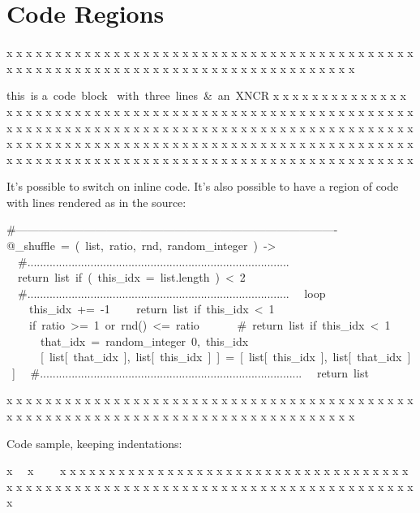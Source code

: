 \section{Code Regions
}
\begin{multicols}{2}x x x x x x x x x x x x x x x x x x x x x x x x x x
x x x x x x x x x x x x x x x x x x x x x x x x x x
x x x x x x x x x x x x x x x x x x x x x x x x x x\mktsShowpar\par
\begingroup\obeyalllines\mktsStyleCode{}this is
a code block 
with three lines \& an XNCR
\endgroup{}x x x x x x x x x x x x x x x x x x x x x x x x x x
x x x x x x x x x x x x x x x x x x x x x x x x x x
x x x x x x x x x x x x x x x x x x x x x x x x x x
x x x x x x x x x x x x x x x x x x x x x x x x x x
x x x x x x x x x x x x x x x x x x x x x x x x x x
x x x x x x x x x x x x x x x x x x x x x x x x x x
x x x x x x x x x x x x x x x x x x x x x x x x x x\mktsShowpar\par
It’s possible to switch on {\mktsStyleCode{}inline code}. It’s also possible
to have a region of code with lines rendered as in the source:
\mktsShowpar\par
\end{multicols}\begingroup\obeyalllines\mktsStyleCode{}\#-------------------------------------------------------------------------------------
@\_shuffle = ( list, ratio, rnd, random\_integer ) ->
  \#...................................................................................
  return list if ( this\_idx = list.length ) < 2
  \#...................................................................................
  loop
    this\_idx += -1
    return list if this\_idx < 1
    if ratio >= 1 or rnd() <= ratio
      \# return list if this\_idx < 1
      that\_idx = random\_integer 0, this\_idx
      [ list[ that\_idx ], list[ this\_idx ] ] = [ list[ this\_idx ], list[ that\_idx ] ]
  \#...................................................................................
  return list
\endgroup{}\begin{multicols}{2}x x x x x x x x x x x x x x x x x x x x x x x x x x
x x x x x x x x x x x x x x x x x x x x x x x x x x
x x x x x x x x x x x x x x x x x x x x x x x x x x\mktsShowpar\par
Code sample, keeping indentations:\mktsShowpar\par
\begingroup\obeyalllines\mktsStyleCode{}x
  x
    x
\endgroup{}x x x x x x x x x x x x x x x x x x x x x x x x x x
x x x x x x x x x x x x x x x x x x x x x x x x x x
x x x x x x x x x x x x x x x x x x x x x x x x x x\mktsShowpar\par
\end{multicols}
